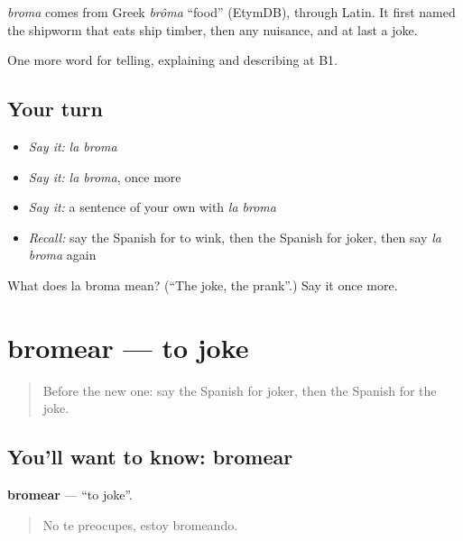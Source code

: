 \begin{cousinweb}
\emph{broma} comes from Greek \emph{brôma} \textquotedblleft{}food\textquotedblright{} (EtymDB), through Latin. It first named the shipworm that eats ship timber, then any nuisance, and at last a joke.
\end{cousinweb}

\begin{grammarlens}[title={What you've built}]
One more word for telling, explaining and describing at B1.
\end{grammarlens}

\subsection*{Your turn}
\begin{itemize}
\raggedright
  \item \emph{Say it:} \emph{la broma}
  \item \emph{Say it:} \emph{la broma}, once more
  \item \emph{Say it:} a sentence of your own with \emph{la broma}
  \item \emph{Recall:} say the Spanish for to wink, then the Spanish for joker, then say \emph{la broma} again
\end{itemize}

\begin{tcolorbox}[breakable,colback=teal!4,colframe=teal!35!black,title={Before you move on}]
What does la broma mean? (\textquotedblleft{}The joke, the prank\textquotedblright{}.) Say it once more.
\end{tcolorbox}
\section[bromear]{bromear — to joke}

\label{lesson:ES-C718-bromear}



\begin{quote}
Before the new one: say the Spanish for joker, then the Spanish for the joke.
\end{quote}

\subsection*{You'll want to know: bromear}
\textbf{bromear} — \textquotedblleft{}to joke\textquotedblright{}.

\begin{quote}
No te preocupes, estoy bromeando.
\end{quote}

